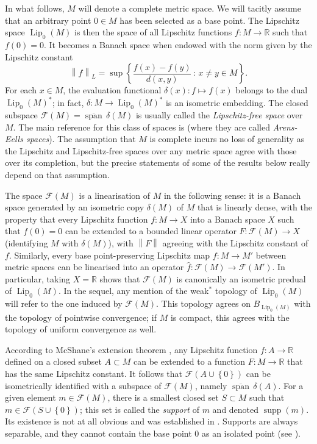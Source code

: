 \documentclass[a4paper,10pt]{amsart}
\DeclareMathOperator{\lspan}{span}                          %
\DeclareMathOperator{\supp}{supp}                           %
\DeclareMathOperator{\Lip}{Lip}                             %
\newcommand{\RR}{\mathbb{R}}                                %
\newcommand{\set}[1]{\left\{{#1}\right\}}                   %
\newcommand{\norm}[1]{\left\|{#1}\right\|}                  %
\newcommand{\cl}[1]{\overline{#1}}                          %
\newcommand{\lipfree}[1]{\mathcal{F}({#1})}                 %
\newcommand{\lipnorm}[1]{\norm{#1}_L}                       %
\theoremstyle{plain}
\theoremstyle{definition}
\theoremstyle{remark}
\begin{document}
In what follows, $M$ will denote a complete metric space. We will tacitly assume that an arbitrary point $0\in M$ has been selected as a base point. The Lipschitz space $\Lip_0(M)$ is then the space of all Lipschitz functions $f:M\to\RR$ such that $f(0)=0$. It becomes a Banach space when endowed with the norm given by the Lipschitz constant
$$
\lipnorm{f} = \sup\set{\frac{f(x)-f(y)}{d(x,y)} \,:\, x\neq y\in M} .
$$
For each $x\in M$, the evaluation functional $\delta(x):f\mapsto f(x)$ belongs to the dual $\Lip_0(M)^*$; in fact, $\delta:M\to\Lip_0(M)^*$ is an isometric embedding. The closed subspace $\lipfree{M} = \cl{\lspan}\,\delta(M)$ is usually called the \emph{Lipschitz-free space} over $M$. The main reference for this class of spaces is \cite{Weaver2} (where they are called \emph{Arens-Eells spaces}). The assumption that $M$ is complete incurs no loss of generality as the Lipschitz and Lipschitz-free spaces over any metric space agree with those over its completion, but the precise statements of some of the results below really depend on that assumption.

The space $\lipfree{M}$ is a linearisation of $M$ in the following sense: it is a Banach space generated by an isometric copy $\delta(M)$ of $M$ that is linearly dense, with the property that every Lipschitz function $f:M\to X$ into a Banach space $X$ such that $f(0)=0$ can be extended to a bounded linear operator $F:\lipfree{M}\to X$ (identifying $M$ with $\delta(M)$), with $\norm{F}$ agreeing with the Lipschitz constant of $f$. Similarly, every base point-preserving Lipschitz map $f:M\to M'$ between metric spaces can be linearised into an operator $\widehat{f}:\lipfree{M}\to\lipfree{M'}$. In particular, taking $X=\RR$ shows that $\lipfree{M}$ is canonically an isometric predual of $\Lip_0(M)$. In the sequel, any mention of the weak$^*$ topology of $\Lip_0(M)$ will refer to the one induced by $\lipfree{M}$. This topology agrees on $B_{\Lip_0(M)}$ with the topology of pointwise convergence; if $M$ is compact, this agrees with the topology of uniform convergence as well.

According to McShane's extension theorem \cite[Theorem 1.33]{Weaver2}, any Lipschitz function $f:A\to\RR$ defined on a closed subset $A\subset M$ can be extended to a function $F:M\to\RR$ that has the same Lipschitz constant. It follows that $\lipfree{A\cup\set{0}}$ can be isometrically identified with a subspace of $\lipfree{M}$, namely $\cl{\lspan}\,\delta(A)$. For a given element $m\in\lipfree{M}$, there is a smallest closed set $S\subset M$ such that $m\in\lipfree{S\cup\set{0}}$; this set is called the \emph{support} of $m$ and denoted $\supp(m)$. Its existence is not at all obvious and was established in \cite{AP_rmi,APPP_2020}. Supports are always separable, and they cannot contain the base point $0$ as an isolated point (see \cite[p. 6]{APPP_2020}).
\end{document}
